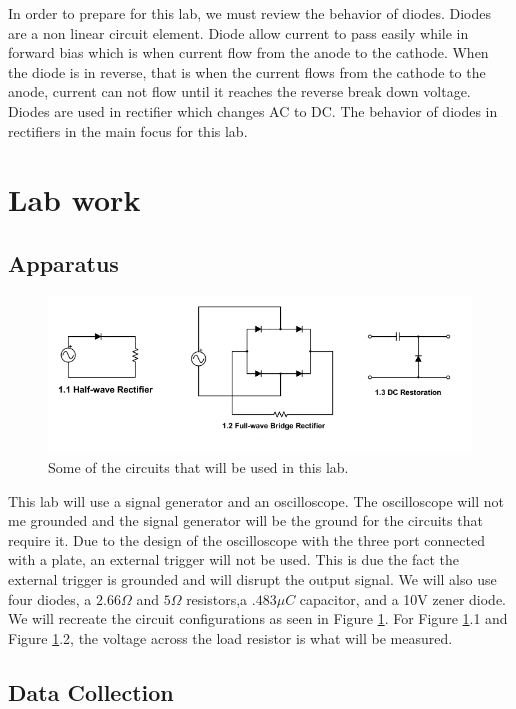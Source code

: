 \documentclass[11pt,letterpaper,onecolumn]{article}
\begin{document}
In order to prepare for this lab, we must review the behavior of diodes. Diodes are a non linear circuit element. Diode allow current to pass easily while in forward bias which is when current flow from the anode to the cathode. When the diode is in reverse, that is when the current flows from the cathode to the anode, current can not flow until it reaches the reverse break down voltage. Diodes are used in rectifier which changes AC to DC. The behavior of diodes in rectifiers in the main focus for this lab. 

\section{Lab work}

\subsection{Apparatus}

\begin{figure}[H]
    \hspace*{-2cm}
    \includegraphics[scale = .9]{Circuits.png}
    \caption{Some of the circuits that will be used in this lab.}
    \label{fig:Cir}
\end{figure}

This lab will use a signal generator and an oscilloscope. The oscilloscope will not me grounded and the signal generator will be the ground for the circuits that require it. Due to the design of the oscilloscope with the three port connected with a plate, an external trigger will not be used. This is due the fact the external trigger is grounded and will disrupt the output signal. We will also use four diodes, a $2.66\Omega$ and $5\Omega$ resistors,a $.483\mu C$ capacitor, and a 10V zener diode. We will recreate the circuit configurations as seen in Figure \ref{fig:Cir}. For Figure \ref{fig:Cir}.1 and Figure \ref{fig:Cir}.2, the voltage across the load resistor is what will be measured. 

\subsection{Data Collection}
\end{document}
